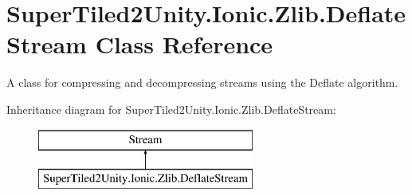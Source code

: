 \hypertarget{class_super_tiled2_unity_1_1_ionic_1_1_zlib_1_1_deflate_stream}{}\section{Super\+Tiled2\+Unity.\+Ionic.\+Zlib.\+Deflate\+Stream Class Reference}
\label{class_super_tiled2_unity_1_1_ionic_1_1_zlib_1_1_deflate_stream}


A class for compressing and decompressing streams using the Deflate algorithm.  


Inheritance diagram for Super\+Tiled2\+Unity.\+Ionic.\+Zlib.\+Deflate\+Stream\+:\begin{figure}[H]
\begin{center}
\leavevmode
\includegraphics[height=2.000000cm]{class_super_tiled2_unity_1_1_ionic_1_1_zlib_1_1_deflate_stream}
\end{center}
\end{figure}
